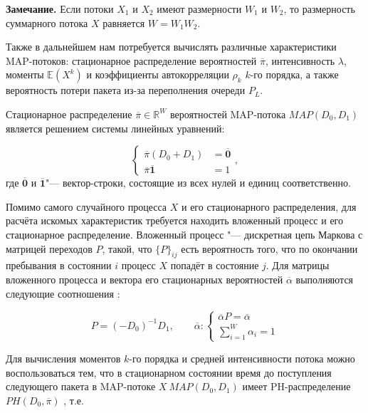 \textbf{Замечание.} Если потоки $X_1$ и $X_2$ имеют размерности $W_1$ и $W_2$, то размерность суммарного потока $X$ равняется $W = W_1 W_2$.

Также в дальнейшем нам потребуется вычислять различные характеристики MAP-потоков: стационарное распределение вероятностей $\overline{\pi}$, интенсивность $\lambda$, моменты $\mathbb{E}(X^{k})$ и коэффициенты автокорреляции $\rho_k$ $k$-го порядка, а также вероятность потери пакета из-за переполнения очереди $P_L$.

Стационарное распределение $\overline{\pi} \in \mathbb{R}^W$ вероятностей MAP-потока $MAP(D_0, D_1)$ является решением системы линейных уравнений:

\begin{equation}
	\label{eq:ch4_map_pdf}
	\begin{cases}
		\overline{\pi}(D_0 + D_1) &= \overline{\mathbf{0}}\\
		\overline{\pi}\overline{\mathbf{1}} &= 1
	\end{cases},
\end{equation}
где $\overline{\mathbf{0}}$ и $\overline{\mathbf{1}}$"--- вектор-строки, состоящие из всех нулей и единиц соответственно.

Помимо самого случайного процесса $X$ и его стационарного распределения, для расчёта искомых характеристик требуется находить вложенный процесс и его стационарное распределение. Вложенный процесс "--- дискретная цепь Маркова с матрицей переходов $P$, такой, что $\{P\}_{ij}$ есть вероятность того, что по окончании пребывания в состоянии $i$ процесс $X$ попадёт в состояние $j$. Для матрицы вложенного процесса и вектора его стационарных вероятностей $\overline{\alpha}$ выполняются следующие соотношения \cite{Horvath2005}:

\begin{equation}
\label{eq:ch4_map_embedded_process}
	P = (-D_0)^{-1} D_1, \qquad
	\overline{\alpha}: \begin{cases}
		\overline{\alpha} P = \overline{\alpha} \\
		\sum\limits_{i=1}^{W} \alpha_i = 1
 	\end{cases}
\end{equation}

Для вычисления моментов $k$-го порядка и средней интенсивности потока можно воспользоваться тем, что в стационарном состоянии время до поступления следующего пакета в MAP-потоке $X~MAP(D_0, D_1)$ имеет PH-распределение $PH(D_0, \overline{\pi})$ \cite{Horvath2005}, т.е.

